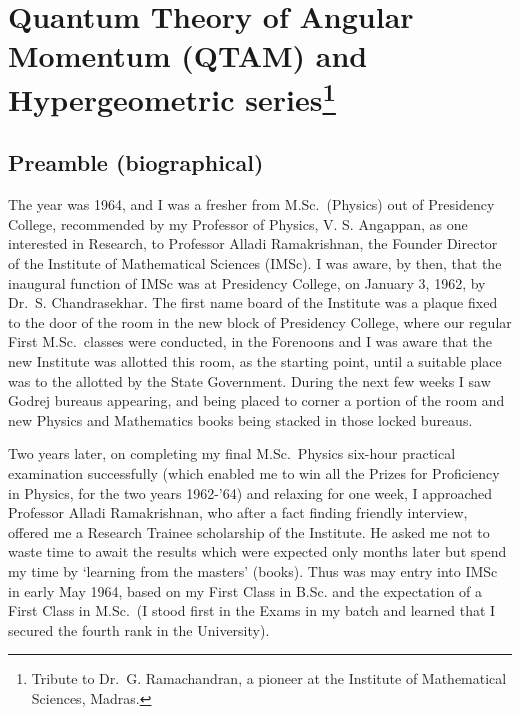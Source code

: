 \renewcommand{\thefootnote}{\arabic{footnote}}

\chapter[Quantum Theory of Angular Momentum and Hypergeometric series]{Quantum Theory of Angular Momentum (QTAM) and Hypergeometric series\footnote{Tribute to Dr.\ G. Ramachandran, a pioneer at the Institute of Mathematical Sciences, Madras.}}\label{chap7}



\section*{Preamble (biographical)}

The year was 1964, and I was a fresher from M.Sc.\ (Physics) out of Presidency College, recommended by my Professor of Physics, V. S. Angappan, as one interested in Research, to Professor Alladi Ramakrishnan, the Founder Director of the Institute of Mathematical Sciences (IMSc). I was aware, by then, that the inaugural function of IMSc was at Presidency College, on January 3, 1962, by Dr.\ S. Chandrasekhar. The first name board of the Institute was a plaque fixed to the door of the room in the new block of Presidency College, where our regular First M.Sc.\ classes were conducted, in the Forenoons and I was aware that the new Institute was allotted this room, as the starting point, until a suitable place was to the allotted by the State Government. During the next few weeks I saw Godrej bureaus appearing, and being placed to corner a portion of the room and new Physics and Mathematics books being stacked in those locked bureaus.

Two years later, on completing my final M.Sc.\ Physics six-hour practical examination successfully (which enabled me to win all the Prizes for Proficiency in Physics, for the two years 1962-'64) and relaxing for one week, I approached Professor Alladi Ramakrishnan, who after a fact finding friendly interview, offered me a Research Trainee scholarship of the Institute. He asked me not to waste time to await the results which were expected only months later but spend my time by `learning from the masters' (books). Thus was may entry into IMSc in early May 1964, based on my First Class in B.Sc. and the expectation of a First Class in M.Sc.\ (I stood first in the Exams in my batch and learned that I secured the fourth rank in the University).


